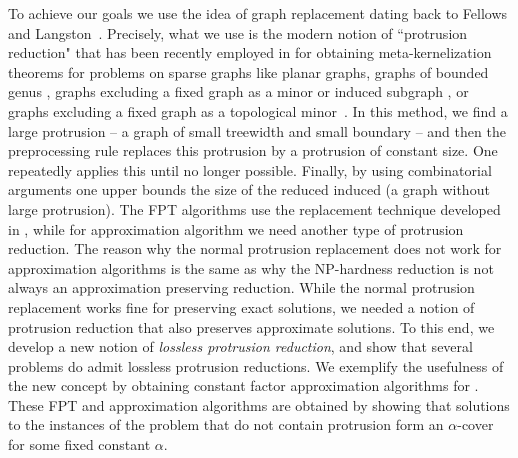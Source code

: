 To achieve our goals we use the idea of graph replacement dating back to Fellows and
Langston~\cite{FellowsL89}.  Precisely, what we use is the modern notion of ``protrusion reduction"  
that has been recently employed  in \cite{H.Bodlaender:2009ng,FominLST10} for obtaining meta-kernelization 
theorems for problems on sparse graphs like planar graphs, graphs of bounded genus \cite{BodlaenderFLPST09}, 
graphs excluding a fixed graph as a minor or induced subgraph \cite{FominLST10,FominLMPS11},  or graphs excluding a fixed graph as a topological minor~\cite{abs-1201-2780}.  In this method, we find a large protrusion -- 
a graph of small treewidth and small boundary -- and then the preprocessing rule replaces this 
protrusion by a protrusion of constant size. One repeatedly applies this until no longer possible. Finally, by using 
combinatorial arguments one upper bounds the size of the reduced induced (a graph without large protrusion). 
The FPT algorithms use the replacement technique developed in \cite{BodlaenderFLPST09,FominLMPS11}, while for approximation algorithm we need another type of protrusion reduction. The reason why the normal protrusion replacement 
does not work for approximation algorithms is the same as why the NP-hardness reduction is not always an approximation preserving reduction. While the normal protrusion replacement works fine for preserving exact solutions, we needed a notion of protrusion reduction that also preserves approximate solutions. To this end, we develop a new notion  of {\em lossless protrusion reduction}, and show that several problems do admit lossless protrusion reductions. We exemplify the usefulness of the new concept by  obtaining constant factor approximation algorithms for \ofd{}. These FPT and approximation algorithms are obtained by showing that  solutions to the instances 
 of the problem that do not contain protrusion form an $\alpha$-cover for some fixed constant $\alpha$.   



